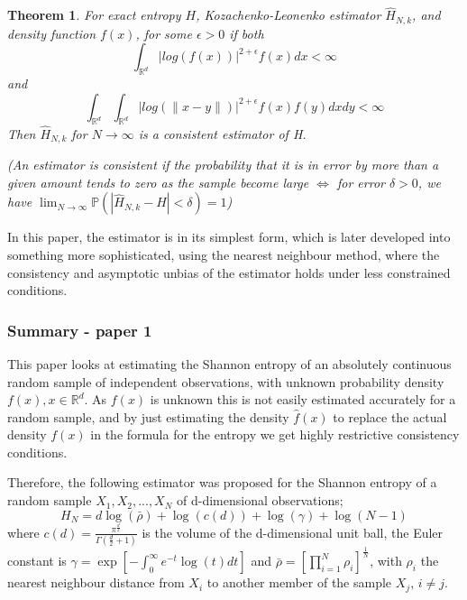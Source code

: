 \documentclass{article}
\newtheorem{theorem}{Theorem}
\begin{document}
\begin{theorem} \label{paper1_T2}
For exact entropy $H$, Kozachenko-Leonenko estimator $\hat{H}_{N,k}$, and density function $f(x)$, for some $\epsilon > 0$ if both
\begin{equation} \label{paper1_T2_eq1}
\int_{\mathbb{R}^{d}} | log(f(x))|^{2 + \epsilon} f(x) dx < \infty \nonumber
\end{equation}
and
\begin{equation} \label{paper1_T2_eq2}
\int_{\mathbb{R}^{d}} \int_{\mathbb{R}^{d}} | log(\|x-y\|)|^{2+ \epsilon} f(x) f(y) dx dy < \infty \nonumber
\end{equation}
Then $\hat{H}_{N, k}$ for $N \to \infty$ is a consistent estimator of H.

(An estimator is consistent if the probability that it is in error by more than a given amount tends to zero as the sample become large $\Leftrightarrow $ for error $\delta > 0$, we have $\lim_{N \to \infty} \mathbb{P}(|\hat{H}_{N,k} - H| < \delta) = 1$) 
\end{theorem}

In this paper, the estimator is in its simplest form, which is later developed into something more sophisticated, using the nearest neighbour method, where the consistency and asymptotic unbias of the estimator holds under less constrained conditions.


\subsubsection{Summary - paper 1}

This paper looks at estimating the Shannon entropy of an absolutely continuous random sample of independent observations, with unknown probability density $f(x), x \in \mathbb{R}^{d}$. As $f(x)$ is unknown this is not easily estimated accurately for a random sample, and by just estimating the density $\hat{f}(x)$ to replace the actual density $f(x)$ in the formula for the entropy we get highly restrictive consistency conditions. 

Therefore, the following estimator was proposed for the Shannon entropy of a random sample $X_{1}, X_{2}, ..., X_{N}$ of d-dimensional observations;
\begin{equation}
H_{N} = d \log(\bar{\rho } ) + \log (c(d)) + \log (\gamma) + \log (N-1)
\end{equation}
where $c(d) = \frac{\pi^{\frac{d}{2}}}{\Gamma ( \frac{d}{2} + 1 )}$ is the volume of the d-dimensional unit ball, the Euler constant is $\gamma = \exp \left[ - \int_{0}^{\infty} e^{-t} \log(t) dt \right]$ and $\bar{\rho} = \left[ \prod_{i=1}^{N} \rho_{i} \right]^{\frac{1}{N}}$, with $\rho_{i}$ the nearest neighbour distance from $X_{i}$ to another member of the sample $X_{j}$, $i \neq j$. 
\end{document}
